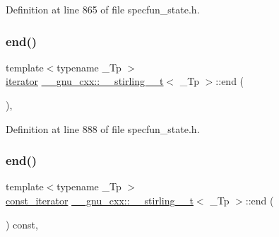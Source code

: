 Definition at line 865 of file specfun\+\_\+state.\+h.

\mbox{\label{struct____gnu__cxx_1_1____stirling__2__t_a51753a61e57621c59b33cd5801ba35e0}} 
\subsubsection{\texorpdfstring{end()}{end()}\hspace{0.1cm}{\footnotesize\ttfamily [1/2]}}
{\footnotesize\ttfamily template$<$typename \+\_\+\+Tp $>$ \\
\hyperlink{struct____gnu__cxx_1_1____stirling__2__t_aa7fda155fac4d993df6fc7deb4a66e84}{iterator} \hyperlink{struct____gnu__cxx_1_1____stirling__2__t}{\+\_\+\+\_\+gnu\+\_\+cxx\+::\+\_\+\+\_\+stirling\+\_\+\_\+t}$<$ \+\_\+\+Tp $>$\+::end (\begin{DoxyParamCaption}{ }\end{DoxyParamCaption})\hspace{0.3cm}{\ttfamily [inline]}, {\ttfamily [noexcept]}}



Definition at line 888 of file specfun\+\_\+state.\+h.

\mbox{\label{struct____gnu__cxx_1_1____stirling__2__t_a4ff9005c06ea578ee331689a08ab0f45}} 
\subsubsection{\texorpdfstring{end()}{end()}\hspace{0.1cm}{\footnotesize\ttfamily [2/2]}}
{\footnotesize\ttfamily template$<$typename \+\_\+\+Tp $>$ \\
\hyperlink{struct____gnu__cxx_1_1____stirling__2__t_a1de3af89467d37bd2d1f1228186c08e8}{const\+\_\+iterator} \hyperlink{struct____gnu__cxx_1_1____stirling__2__t}{\+\_\+\+\_\+gnu\+\_\+cxx\+::\+\_\+\+\_\+stirling\+\_\+\_\+t}$<$ \+\_\+\+Tp $>$\+::end (\begin{DoxyParamCaption}{ }\end{DoxyParamCaption}) const\hspace{0.3cm}{\ttfamily [inline]}, {\ttfamily [noexcept]}}



